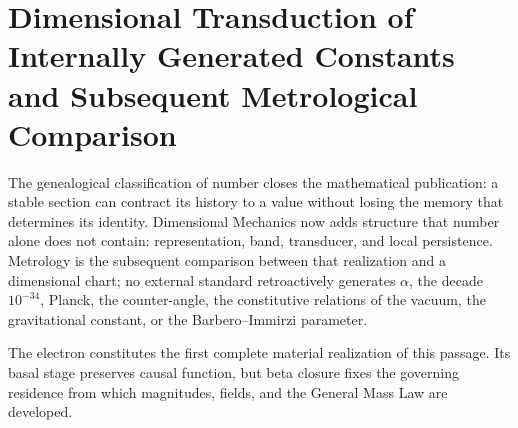 \providecommand{\HMTParteIIIConstantesTransitionsRoot}{sections/transiciones_constantes}

\section{Dimensional Transduction of Internally Generated Constants and Subsequent Metrological Comparison}

The genealogical classification of number closes the mathematical publication: a stable section can contract its history to a value without losing the memory that determines its identity. Dimensional Mechanics now adds structure that number alone does not contain: representation, band, transducer, and local persistence. Metrology is the subsequent comparison between that realization and a dimensional chart; no external standard retroactively generates \(\alpha\), the decade \(10^{-34}\), Planck, the counter-angle, the constitutive relations of the vacuum, the gravitational constant, or the Barbero--Immirzi parameter.



The electron constitutes the first complete material realization of this passage. Its basal stage preserves causal function, but beta closure fixes the governing residence from which magnitudes, fields, and the General Mass Law are developed.
